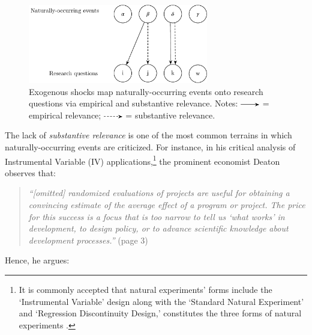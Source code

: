 \begin{refsection}
\begin{figure}[!htbp]
  \centering
  \includegraphics[width=0.7\textwidth]{exhibits/event_rq_mapping.pdf}
  \caption{Exogenous shocks map naturally-occurring events onto 
  research questions via empirical and substantive relevance. Notes:
  \includegraphics[width=0.075\textwidth]{exhibits/event_rq_mapping_0.pdf}
  = empirical relevance; 
  \includegraphics[width=0.075\textwidth]{exhibits/event_rq_mapping_1.pdf}
   = substantive relevance.}
  \label{fig:event_rq_mapping}
\end{figure}

The lack of \textit{substantive relevance} is one of the most common terrains in which
naturally-occurring events are criticized. For instance, in his critical
analysis of Instrumental Variable (IV) applications,\footnote{It is commonly
accepted that natural experiments' forms include the `Instrumental Variable'
design along with the `Standard Natural Experiment' and `Regression
Discontinuity Design,'  constitutes the three forms of natural experiments
\parencite{sieweke_santoni_2020,dunning_2012}.} the prominent economist
Deaton \parencite*{deaton_2009} observes that:

\begin{quote}
\textit{
  ``[omitted] randomized evaluations of projects are useful for obtaining a convincing
  estimate of the average effect of a program or project. The price for this
  success is a focus that is too narrow to tell us `what works' in development,
  to design policy, or to advance scientific knowledge about development
  processes.''
  }
  (page 3)
\end{quote}

Hence, he argues:


\end{refsection}
